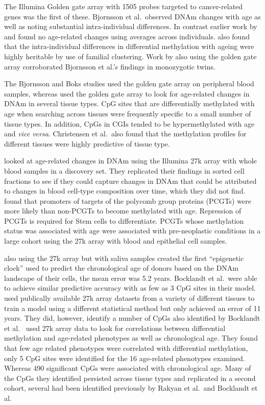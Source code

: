 \documentclass[]{book}
\begin{document}
The Illumina Golden gate array \citep{Bibikova2006} with 1505 probes targeted to cancer-related genes was the first of these. Bjornsson et al.~observed DNAm changes with age as well as noting substantial intra-individual differences. In contrast earlier work by \citet{Eckhardt2006} and \citet{Ehrlich1982} found no age-related changes using averages across individuals. \citet{Bjornsson2008} also found that the intra-individual differences in differential methylation with ageing were highly heritable by use of familial clustering. Work by \citet{Boks2009} also using the golden gate array corroborated Bjornsson et al.'s findings in monozygotic twins.

The Bjornsson and Boks studies used the golden gate array on peripheral blood samples, whereas \citet{Christensen2009} used the golden gate array to look for age-related changes in DNAm in several tissue types. CpG sites that are differentially methylated with age when searching across tissues were frequently specific to a small number of tissue types. In addition, CpGs in CGIs tended to be hypermethylated with age and \emph{vice versa}. Christensen et al.~also found that the methylation profiles for different tissues were highly predictive of tissue type.

\citet{Rakyan2010} looked at age-related changes in DNAm using the Illumina 27k array \citep{Bibikova2009} with whole blood samples in a discovery set. They replicated their findings in sorted cell fractions to see if they could capture changes in DNAm that could be attributed to changes in blood cell-type composition over time, which they did not find. \citet{Teschendorff2010} found that promoters of targets of the polycomb group proteins (PCGTs) were more likely than non-PCGTs to become methylated with age. Repression of PCGTs is required for Stem cells to differentiate. PCGTs whose methylation status was associated with age were associated with pre-neoplastic conditions in a large cohort using the 27k array with blood and epithelial cell samples.

\citet{Bocklandt2011} also using the 27k array but with saliva samples created the first ``epigenetic clock'' used to predict the chronological age of donors based on the DNAm landscape of their cells, the mean error was 5.2 years. Bocklandt et al.~were able to achieve similar predictive accuracy with as few as 3 CpG sites in their model. \citet{Koch2011} used publically available 27k array datasets from a variety of different tissues to train a model using a different statistical method but only achieved an error of 11 years. They did, however, identify a number of CpGs also identified by Bocklandt et al.~\citet{Bell2012} used 27k array data to look for correlations between differential methylation and age-related phenotypes as well as chronological age. They found that few age related phenotypes were correlated with differential methylation, only 5 CpG sites were identified for the 16 age-related phenotypes examined. Whereas 490 significant CpGs were associated with chronological age. Many of the CpGs they identified persisted across tissue types and replicated in a second cohort, several had been identified previously by Rakyan et al.~and Bocklandt et al.
\end{document}
